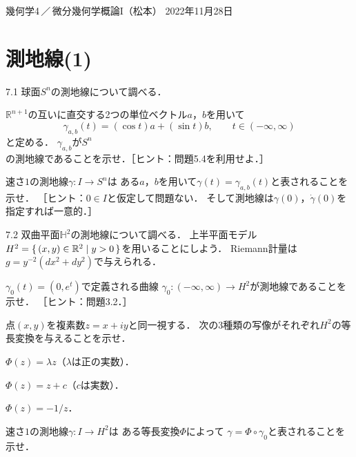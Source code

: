 \documentclass[uplatex,dvipdfmx,fontsize=12pt,jafontsize=11pt,line_length=42zw,number_of_lines=36,hanging_punctuation]{jlreq}
\newcommand{\compose}{\mathbin{\circ}}
\begin{document}
\begin{flushleft}
	幾何学4\,／\,微分幾何学概論I（松本）
	\hfill
	2022年11月28日
\end{flushleft}
\setcounter{section}{6}
\section{測地線(1)}

\begin{enumerate-problems}
	\item[7.1]
		球面$S^n$の測地線について調べる．
		\begin{enumerate-subproblems}
			\item
				$\mathbb{R}^{n+1}$の互いに直交する2つの単位ベクトル$a$，$b$を用いて
				\begin{equation}
					\gamma_{a,b}(t)=(\cos t)a+(\sin t)b,\qquad t\in(-\infty,\infty)
				\end{equation}
				と定める．
				$\gamma_{a,b}$が$S^n$の測地線であることを示せ．［ヒント：問題5.4を利用せよ．］
			\item
				速さ$1$の測地線$\gamma\colon I\to S^n$は
				ある$a$，$b$を用いて$\gamma(t)=\gamma_{a,b}(t)$と表されることを示せ．
				［ヒント：$0\in I$と仮定して問題ない．
				そして測地線は$\gamma(0)$，$\dot{\gamma}(0)$を指定すれば一意的．］
		\end{enumerate-subproblems}
	\item[7.2]
		双曲平面$\mathbb{H}^2$の測地線について調べる．
		上半平面モデル$H^2=\set{(x,y)\in\mathbb{R}^2|y>0}$を用いることにしよう．
		Riemann計量は$g=y^{-2}(dx^2+dy^2)$で与えられる．
		\begin{enumerate-subproblems}
			\item
				$\gamma_0(t)=(0,e^t)$で定義される曲線
				$\gamma_0\colon(-\infty,\infty)\to H^2$が測地線であることを示せ．
				［ヒント：問題3.2．］
			\item
				点$(x,y)$を複素数$z=x+iy$と同一視する．
				次の3種類の写像がそれぞれ$H^2$の等長変換を与えることを示せ．
				\begin{enumerate-alphabet}
					\item $\Phi(z)=\lambda z$（$\lambda$は正の実数）．
					\item $\Phi(z)=z+c$（$c$は実数）．
					\item $\Phi(z)=-1/z$．
				\end{enumerate-alphabet}
			\item
				速さ$1$の測地線$\gamma\colon I\to H^2$は
				ある等長変換$\Phi$によって
				$\gamma=\Phi\compose\gamma_0$と表されることを示せ．


\end{enumerate-subproblems}
\end{enumerate-problems}
\end{document}
